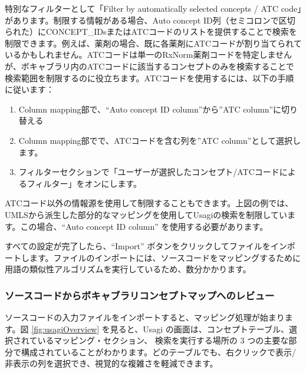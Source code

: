 \documentclass[
  11pt]{book}
\providecommand{\tightlist}{%
  \setlength{\itemsep}{0pt}\setlength{\parskip}{0pt}}
\theoremstyle{definition}
\theoremstyle{definition}
\theoremstyle{definition}
\theoremstyle{definition}
\theoremstyle{remark}
\begin{document}
特別なフィルターとして「Filter by automatically selected concepts / ATC code」があります。制限する情報がある場合、Auto concept ID列（セミコロンで区切られた）にCONCEPT\_IDsまたはATCコードのリストを提供することで検索を制限できます。例えば、薬剤の場合、既に各薬剤にATCコードが割り当てられているかもしれません。ATCコードは単一のRxNorm薬剤コードを特定しませんが、ボキャブラリ内のATCコードに該当するコンセプトのみを検索することで検索範囲を制限するのに役立ちます。ATCコードを使用するには、以下の手順に従います：

\begin{enumerate}
\def\labelenumi{\arabic{enumi}.}
\tightlist
\item
  Column mapping部で、``Auto concept ID column''から''ATC column''に切り替える
\item
  Column mapping部でで、ATCコードを含む列を''ATC column''として選択します。
\item
  フィルターセクションで「ユーザーが選択したコンセプト/ATCコードによるフィルター」をオンにします。
\end{enumerate}

ATCコード以外の情報源を使用して制限することもできます。上図の例では、UMLSから派生した部分的なマッピングを使用してUsagiの検索を制限しています。この場合、``Auto concept ID column'' を使用する必要があります。

すべての設定が完了したら、``Import'' ボタンをクリックしてファイルをインポートします。ファイルのインポートには、ソースコードをマッピングするために用語の類似性アルゴリズムを実行しているため、数分かかります。

\subsubsection*{ソースコードからボキャブラリコンセプトマップへのレビュー}\label{ux30bdux30fcux30b9ux30b3ux30fcux30c9ux304bux3089ux30dcux30adux30e3ux30d6ux30e9ux30eaux30b3ux30f3ux30bbux30d7ux30c8ux30deux30c3ux30d7ux3078ux306eux30ecux30d3ux30e5ux30fc}

ソースコードの入力ファイルをインポートすると、マッピング処理が始まります。図 \ref{fig:usagiOverview} を見ると、Usagi の画面は、コンセプトテーブル、選択されているマッピング・セクション、 検索を実行する場所の 3 つの主要な部分で構成されていることがわかります。どのテーブルでも、右クリックで表示/非表示の列を選択でき、視覚的な複雑さを軽減できます。
\end{document}
